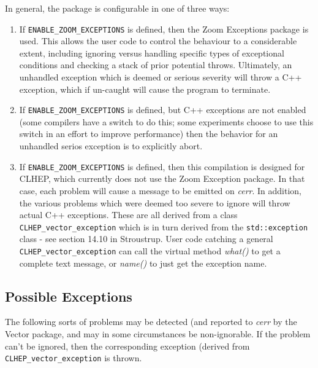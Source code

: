 In general, the package is configurable in one of three ways:
\begin{enumerate}
\item
If {\tt ENABLE\_ZOOM\_EXCEPTIONS} is defined, then the Zoom Exceptions
package is used.  This allows the user code to control the behaviour to 
a considerable extent, including ignoring versus handling specific types
of exceptional conditions and checking a stack of prior potential throws.
Ultimately, an unhandled exception which is deemed or serious severity will
throw a C++ exception, which if un-caught will cause the program to terminate.
\item
If {\tt ENABLE\_ZOOM\_EXCEPTIONS} is defined, but C++ exceptions are not
enabled (some compilers have a switch to do this; some experiments choose
to use this switch in an effort to improve performance) then the behavior
for an unhandled serios exception is to explicitly abort.
\item
If {\tt ENABLE\_ZOOM\_EXCEPTIONS} is defined, then this compilation is designed
for CLHEP, which currently does not use the Zoom Exception package.
In that case, each problem will cause a message to be emitted on {\em cerr}.
In addition, the various problems which were deemed too severe to
ignore will throw actual C++ exceptions.  These are all derived from
a class {\tt CLHEP\_vector\_exception} which is in turn derived from 
the {\tt std::exception} class - see section 14.10 in Stroustrup.  
User code catching a general {\tt CLHEP\_vector\_exception} can call the
virtual method {\em what()} to get a complete text message, or {\em name()}
to just get the exception name.  
\end{enumerate}

\subsection{Possible Exceptions}

The following sorts of problems may be detected (and reported to {\em cerr}
by the Vector package,
and may in some circumstances be non-ignorable.  
If the problem can't be ignored, then the corresponding exception 
(derived from {\tt CLHEP\_vector\_exception} is thrown.

